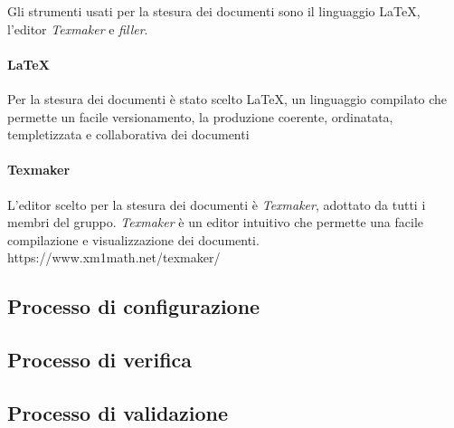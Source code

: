 Gli strumenti usati per la stesura dei documenti sono il linguaggio \LaTeX, l'editor \textit{Texmaker} e \textit{filler}.

\paragraph{\LaTeX}

Per la stesura dei documenti è stato scelto \LaTeX, un linguaggio compilato che permette un facile versionamento, la produzione coerente, ordinatata, templetizzata e collaborativa dei documenti

\paragraph{Texmaker}

L'editor scelto per la stesura dei documenti è \textit{Texmaker}, adottato da tutti i membri del gruppo. \textit{Texmaker} è un editor intuitivo che permette una facile compilazione e visualizzazione dei documenti.\newline
https://www.xm1math.net/texmaker/

\subsection{Processo di configurazione}

\subsection{Processo di verifica}

\subsection{Processo di validazione}